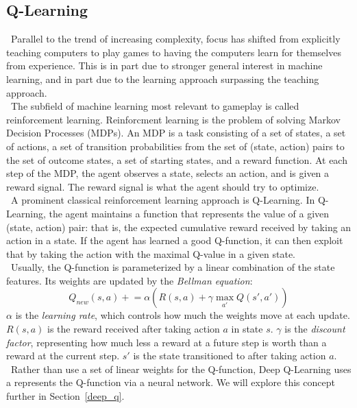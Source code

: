 \documentclass[conference]{IEEEtran}
\begin{document}
\subsection{Q-Learning}\label{ql}
\noindent\ Parallel to the trend of increasing complexity, focus has shifted
from explicitly teaching computers to play games to having the computers learn
for themselves from experience. This is in part due to stronger general
interest in machine learning, and in part due to the learning approach
surpassing the teaching approach.\\
\indent\ The subfield of machine learning most relevant to gameplay is called
reinforcement learning. Reinforcment learning is the problem of solving Markov
Decision Processes (MDPs).  An MDP is a task consisting of a set of states, a
set of actions, a set of transition probabilities from the set of (state,
action) pairs to the set of outcome states, a set of starting states, and a
reward function. At each step of the MDP, the agent observes a state, selects
an action, and is given a reward signal. The reward signal is what the agent
should try to optimize.\\
\indent\ A prominent classical reinforcement learning approach is Q-Learning.
In Q-Learning, the agent maintains a function that represents the value of a
given (state, action) pair: that is, the expected cumulative reward received by
taking an action in a state. If the agent has learned a good Q-function, it can
then exploit that by taking the action with the maximal Q-value in a given
state.\\
\indent\ Usually, the Q-function is parameterized by a linear combination of
the state features. Its weights are updated by the \emph{Bellman equation}:
\begin{equation}
    Q_{new}(s, a)\mathrel{+}=\alpha\left(R(s,a)+\gamma\max_{a'}Q(s',a')\right)
\end{equation}
$\alpha$ is the \emph{learning rate}, which controls how much the weights move
at each update.  $R(s, a)$ is the reward received after taking action $a$ in
state $s$. $\gamma$ is the \emph{discount factor}, representing how much less
a reward at a future step is worth than a reward at the current step. $s'$
is the state transitioned to after taking action $a$.\\
\indent\ Rather than use a set of linear weights for the Q-function, Deep
Q-Learning uses a represents the Q-function via a neural network. We will
explore this concept further in Section~\ref{deep_q}.
\end{document}
